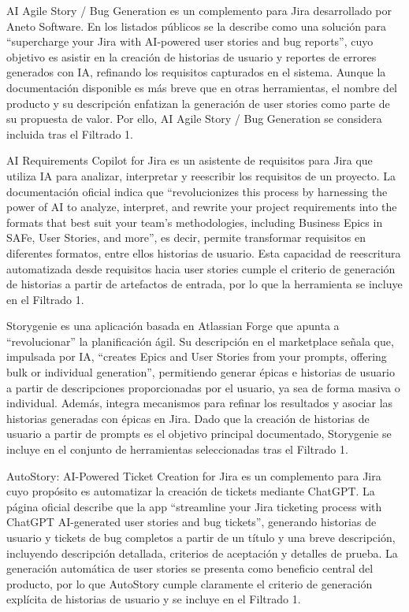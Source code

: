 AI Agile Story / Bug Generation \cite{aiagilestory} es un complemento para Jira desarrollado por Aneto Software. En los listados públicos se la describe como una solución para “supercharge your Jira with AI-powered user stories and bug reports”, cuyo objetivo es asistir en la creación de historias de usuario y reportes de errores generados con IA, refinando los requisitos capturados en el sistema. Aunque la documentación disponible es más breve que en otras herramientas, el nombre del producto y su descripción enfatizan la generación de user stories como parte de su propuesta de valor. Por ello, AI Agile Story / Bug Generation se considera incluida tras el Filtrado 1. 

AI Requirements Copilot for Jira \cite{airequirementscopilot} es un asistente de requisitos para Jira que utiliza IA para analizar, interpretar y reescribir los requisitos de un proyecto. La documentación oficial indica que “revolucionizes this process by harnessing the power of AI to analyze, interpret, and rewrite your project requirements into the formats that best suit your team's methodologies, including Business Epics in SAFe, User Stories, and more”, es decir, permite transformar requisitos en diferentes formatos, entre ellos historias de usuario. Esta capacidad de reescritura automatizada desde requisitos hacia user stories cumple el criterio de generación de historias a partir de artefactos de entrada, por lo que la herramienta se incluye en el Filtrado 1.

Storygenie \cite{storygenie} es una aplicación basada en Atlassian Forge que apunta a “revolucionar” la planificación ágil. Su descripción en el marketplace señala que, impulsada por IA, “creates Epics and User Stories from your prompts, offering bulk or individual generation”, permitiendo generar épicas e historias de usuario a partir de descripciones proporcionadas por el usuario, ya sea de forma masiva o individual. Además, integra mecanismos para refinar los resultados y asociar las historias generadas con épicas en Jira. Dado que la creación de historias de usuario a partir de prompts es el objetivo principal documentado, Storygenie se incluye en el conjunto de herramientas seleccionadas tras el Filtrado 1.

AutoStory: AI-Powered Ticket Creation for Jira \cite{autostory} es un complemento para Jira cuyo propósito es automatizar la creación de tickets mediante ChatGPT. La página oficial describe que la app “streamline your Jira ticketing process with ChatGPT AI-generated user stories and bug tickets”, generando historias de usuario y tickets de bug completos a partir de un título y una breve descripción, incluyendo descripción detallada, criterios de aceptación y detalles de prueba. La generación automática de user stories se presenta como beneficio central del producto, por lo que AutoStory cumple claramente el criterio de generación explícita de historias de usuario y se incluye en el Filtrado 1.


